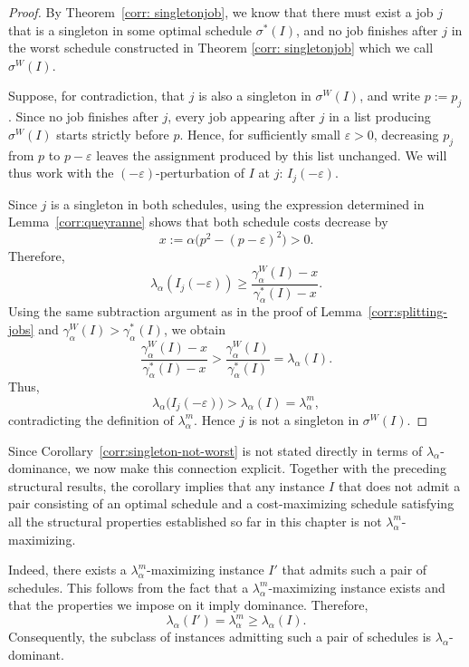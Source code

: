 \documentclass[%
english, titlepage=false %
]{./tum-templates/book/tumbook}
\begin{document}
\begin{proof}
By Theorem~\ref{corr: singletonjob}, we know that there must exist a job \(j\) that is a singleton in
some optimal schedule \(\sigma^{*}(I)\), and no job finishes after \(j\) in the worst schedule constructed in Theorem \ref{corr: singletonjob} which we call
\(\sigma^{W}(I)\).

Suppose, for contradiction, that \(j\) is also a singleton in
\(\sigma^W(I)\), and write \(p:=p_{j}\). Since no job finishes
after \(j\), every job appearing after \(j\) in a list
producing \(\sigma^W(I)\) starts strictly before \(p\). Hence, for
sufficiently small \(\varepsilon>0\), decreasing \(p_{j}\) from
\(p\) to \(p-\varepsilon\) leaves the assignment produced by this list
unchanged. We will thus work with the $(-\varepsilon)$-perturbation of $I$ at $j$: \(I_{j}(-\varepsilon)\).

Since \(j\) is a singleton in both schedules, using the expression determined in 
Lemma~\ref{corr:queyranne} shows that both schedule costs decrease
by
\[
x
:=
\alpha\bigl(p^2-(p-\varepsilon)^2\bigr)>0.
\]
Therefore,
\[
\lambda_\alpha(I_{j}(-\varepsilon))
\ge
\frac{\gamma_\alpha^W(I)-x}
     {\gamma_\alpha^*(I)-x}.
\]
Using the same subtraction argument as in the proof of
Lemma~\ref{corr:splitting-jobs} and
\(\gamma_\alpha^W(I)>\gamma_\alpha^*(I)\), we obtain
\[
\frac{\gamma_\alpha^W(I)-x}
     {\gamma_\alpha^*(I)-x}
>
\frac{\gamma_\alpha^W(I)}
     {\gamma_\alpha^*(I)}
=
\lambda_\alpha(I).
\]
Thus,
\[
    \lambda_\alpha\bigl(I_j(-\varepsilon)\bigr)
    >
    \lambda_\alpha(I)
    =
    \lambda_\alpha^m,
\]
contradicting the definition of $\lambda_\alpha^m$. Hence $j$ is not
a singleton in $\sigma^W(I)$.
\end{proof}

Since Corollary~\ref{corr:singleton-not-worst} is not stated directly
in terms of \(\lambda_\alpha\)-dominance, we now make this connection
explicit. Together with the preceding structural results, the corollary
implies that any instance \(I\) that does not admit a pair consisting of
an optimal schedule and a cost-maximizing schedule satisfying all the
structural properties established so far in this chapter is not
\(\lambda_\alpha^m\)-maximizing.

Indeed, there exists a \(\lambda_\alpha^m\)-maximizing instance \(I'\)
that admits such a pair of schedules. This follows from the fact that a $\lambda^m_{\alpha}$-maximizing instance
exists and that the properties we impose on it imply dominance. Therefore,
\[
    \lambda_\alpha(I')
    =
    \lambda_\alpha^m
    \geq
    \lambda_\alpha(I).
\]
Consequently, the subclass of instances admitting such a pair of schedules
is \(\lambda_\alpha\)-dominant. 
\end{document}

